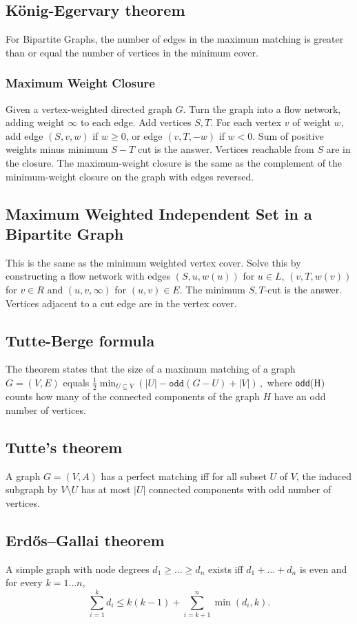 \subsection{König-Egervary theorem}
	For Bipartite Graphs, the number of edges in the maximum matching is greater than or equal the number of vertices in the minimum cover.
	
\subsubsection{Maximum Weight Closure}
Given a vertex-weighted directed graph $G$. Turn the graph into a flow
network, adding weight $\infty$ to each edge. Add vertices $S,T$. For
each vertex $v$ of weight $w$, add edge $(S,v,w)$ if $w\geq 0$, or edge
$(v,T,-w)$ if $w<0$. Sum of positive weights minus minimum $S-T$ cut is
the answer. Vertices reachable from $S$ are in the closure. The
maximum-weight closure is the same as the complement of the
minimum-weight closure on the graph with edges reversed.

\subsection{Maximum Weighted Independent Set in a Bipartite Graph}
This is the same as the minimum weighted vertex cover. Solve this by
constructing a flow network with edges $(S,u,w(u))$ for $u\in L$,
$(v,T,w(v))$ for $v\in R$ and $(u,v,\infty)$ for $(u,v)\in E$. The
minimum $S,T$-cut is the answer. Vertices adjacent to a cut edge are
in the vertex cover.

\subsection{Tutte-Berge formula}
The theorem states that the size of a maximum matching of a graph $G=(V,E)$ equals ${\frac {1}{2}}\min _{U\subseteq V}\left(|U|- \texttt{odd}(G-U)+|V|\right)\,,$ where \texttt{odd}(H) counts how many of the connected components of the graph $H$ have an odd number of vertices.

\subsection{Tutte's theorem}
A graph $G = (V, A)$ has a perfect matching iff for all subset $U$ of $V$, the induced subgraph by $V \setminus U$ has at most $|U|$ connected components with odd number of vertices.

\subsection{Erdős–Gallai theorem}
A simple graph with node degrees $d_1 \ge \dots \ge d_n$ exists iff $d_1 + \dots + d_n$ is even and for every $k = 1\dots n$,
\[ \sum _{i=1}^{k}d_{i}\leq k(k-1)+\sum _{i=k+1}^{n}\min(d_{i},k). \]


